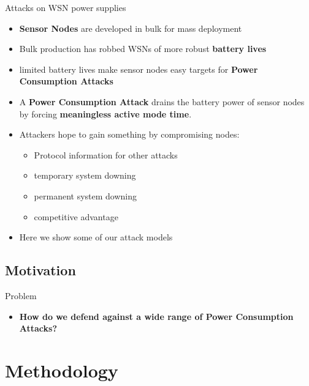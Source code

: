 \documentclass{beamer}
\begin{document}
\begin{frame}{Attacks on WSN power supplies}
\begin{itemize}
	\item \textbf{Sensor Nodes} are developed in bulk for mass deployment 
	\item Bulk production has robbed WSNs of more robust \textbf{battery lives}
	\item limited battery lives make sensor nodes easy targets for \textbf{Power Consumption Attacks}
	\item A \textbf{Power Consumption Attack} drains the battery power of sensor nodes by forcing \textbf{meaningless active mode time}.
	\item Attackers hope to gain something by compromising nodes:
	\begin{itemize}
		\item Protocol information for other attacks
		\item temporary system downing
		\item permanent system downing
		\item competitive advantage
	\end{itemize}
	\item Here we show some of our attack models
\end{itemize}	
\end{frame}


\subsection{Motivation}

\begin{frame}{Problem}
\begin{itemize}

	\item \textbf{How do we defend against a wide range of Power Consumption Attacks?}
	
\end{itemize}
\end{frame}

\section{Methodology}
\end{document}
